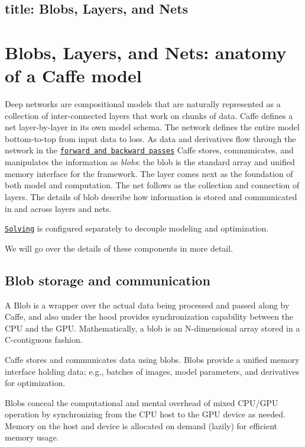 

 \subsection*{title\+: Blobs, Layers, and Nets }

\section*{Blobs, Layers, and Nets\+: anatomy of a Caffe model}

Deep networks are compositional models that are naturally represented as a collection of inter-\/connected layers that work on chunks of data. Caffe defines a net layer-\/by-\/layer in its own model schema. The network defines the entire model bottom-\/to-\/top from input data to loss. As data and derivatives flow through the network in the \href{forward_backward.html}{\tt forward and backward passes} Caffe stores, communicates, and manipulates the information as {\itshape blobs}\+: the blob is the standard array and unified memory interface for the framework. The layer comes next as the foundation of both model and computation. The net follows as the collection and connection of layers. The details of blob describe how information is stored and communicated in and across layers and nets.

\href{solver.html}{\tt Solving} is configured separately to decouple modeling and optimization.

We will go over the details of these components in more detail.

\subsection*{Blob storage and communication}

A Blob is a wrapper over the actual data being processed and passed along by Caffe, and also under the hood provides synchronization capability between the C\+PU and the G\+PU. Mathematically, a blob is an N-\/dimensional array stored in a C-\/contiguous fashion.

Caffe stores and communicates data using blobs. Blobs provide a unified memory interface holding data; e.\+g., batches of images, model parameters, and derivatives for optimization.

Blobs conceal the computational and mental overhead of mixed C\+P\+U/\+G\+PU operation by synchronizing from the C\+PU host to the G\+PU device as needed. Memory on the host and device is allocated on demand (lazily) for efficient memory usage.

